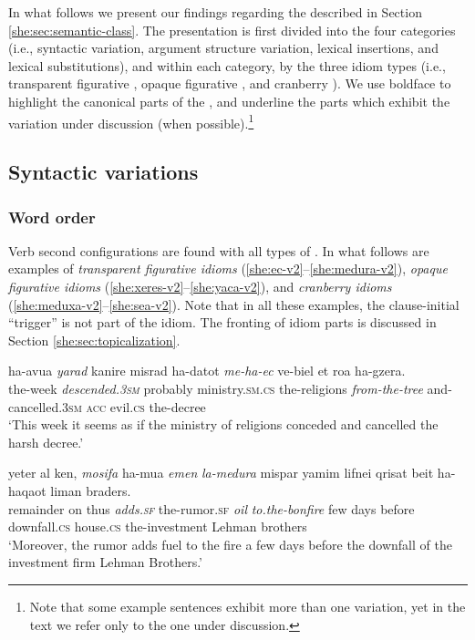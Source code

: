 \documentclass[output=paper]{langsci/langscibook}
\begin{document}
In what follows we present our findings regarding the  described in Section \ref{she:sec:semantic-class}. The presentation is first divided into the four  categories (i.e., syntactic variation, argument structure variation, lexical insertions, and lexical substitutions), and within each category, by the three idiom types (i.e., transparent figurative , opaque figurative , and cranberry ). We use boldface to highlight the canonical parts of the , and underline the parts which exhibit the variation under discussion (when possible).\footnote{Note that some example sentences exhibit more than one variation, yet in the text we refer only to the one under discussion.}

\subsection{Syntactic variations}
\label{she:sec:sv}

\subsubsection{Word order}
\label{she:sec:order}

Verb second configurations are found with all types of . In what follows are examples of \textit{transparent figurative idioms} (\ref{she:ec-v2}--\ref{she:medura-v2}), \textit{opaque figurative idioms} (\ref{she:xeres-v2}--\ref{she:yaca-v2}), and \textit{cranberry idioms} (\ref{she:meduxa-v2}--\ref{she:sea-v2}). Note that in all these examples, the clause-initial ``trigger'' is not part of the idiom. The fronting of idiom parts is discussed in Section \ref{she:sec:topicalization}.

    \ea\label{she:ec-v2}
        \gll ha-{\shin}avu{\ayin}a \textit{yarad} kanir{\alef}e misrad ha-datot \textit{me-ha-{\ayin}ec} ve-bi{\tet}el {\alef}et ro{\ayin}a ha-gzera.\\
            the-week \textit{descended.\textsc{3sm}} probably ministry.\textsc{sm}.\textsc{cs} the-religions \textit{from-the-tree} and-cancelled.\textsc{3sm} \textsc{acc} evil.\textsc{cs} the-decree \\
        \glt `This week it seems as if the ministry of religions conceded and cancelled the harsh decree.'
    \z

    \ea\label{she:medura-v2}
        \gll yeter {\ayin}al ken, \textit{mosifa} ha-{\shin}mu{\ayin}a \textit{{\shin}emen} \textit{la-medura} mispar yamim lifnei qrisat beit ha-ha{\shin}qa{\ayin}ot liman braders.\\
            remainder on thus \textit{adds.\textsc{sf}} the-rumor.\textsc{sf} \textit{oil} \textit{to.the-bonfire} few days before downfall.\textsc{cs} house.\textsc{cs} the-investment Lehman brothers\\
        \glt `Moreover, the rumor adds fuel to the fire a few days before the downfall of the investment firm Lehman Brothers.'
    \z
\end{document}
